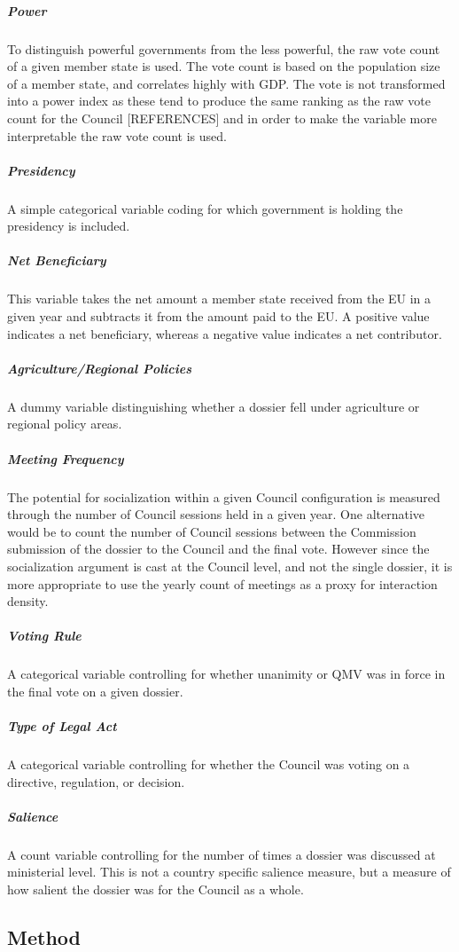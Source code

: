 \subparagraph{Power} To distinguish powerful governments from the less powerful, the raw vote count of a given member state is used. The vote count is based on the population size of a member state, and correlates highly with GDP. The vote is not transformed into a power index as these tend to produce the same ranking as the raw vote count for the Council [REFERENCES] and in order to make the variable more interpretable the raw vote count is used. 

\subparagraph{Presidency} A simple categorical variable coding for which government is holding the presidency is included.

\subparagraph{Net Beneficiary} This variable takes the net amount a member state received from the EU in a given year and subtracts it from the amount paid to the EU. A positive value indicates a net beneficiary, whereas a negative value indicates a net contributor. 

\subparagraph{Agriculture/Regional Policies} A dummy variable distinguishing whether a dossier fell under agriculture or regional policy areas.

\subparagraph{Meeting Frequency} The potential for socialization within a given Council configuration is measured through the number of Council sessions held in a given year. One alternative would be to count the number of Council sessions between the Commission submission of the dossier to the Council and the final vote. However since the socialization argument is cast at the Council level, and not the single dossier, it is more appropriate to use the yearly count of meetings as a proxy for interaction density. 

\subparagraph{Voting Rule} A categorical variable controlling for whether unanimity or QMV was in force in the final vote on a given dossier.

\subparagraph{Type of Legal Act} A categorical variable controlling for whether the Council was voting on a directive, regulation, or decision. 

\subparagraph{Salience} A count variable controlling for the number of times a dossier was discussed at ministerial level. This is not a country specific salience measure, but a measure of how salient the dossier was for the Council as a whole. 

\subsection{Method}

